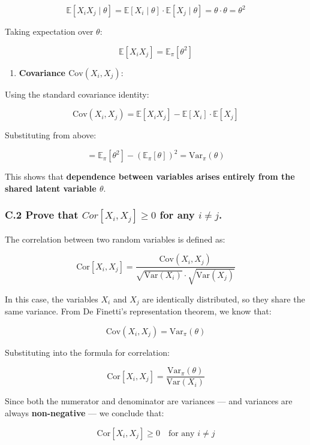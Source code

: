 \documentclass[
]{article}
\providecommand{\tightlist}{%
  \setlength{\itemsep}{0pt}\setlength{\parskip}{0pt}}
\begin{document}
\[
\mathbb{E}[X_i X_j \mid \theta] = \mathbb{E}[X_i \mid \theta] \cdot \mathbb{E}[X_j \mid \theta] = \theta \cdot \theta = \theta^2
\]

Taking expectation over \(\theta\):

\[
\mathbb{E}[X_i X_j] = \mathbb{E}_\pi[\theta^2]
\]

\begin{enumerate}
\def\labelenumi{\arabic{enumi}.}
\setcounter{enumi}{2}
\tightlist
\item
  \textbf{Covariance \(\text{Cov}(X_i, X_j)\)}:
\end{enumerate}

Using the standard covariance identity:

\[
\text{Cov}(X_i, X_j) = \mathbb{E}[X_i X_j] - \mathbb{E}[X_i] \cdot \mathbb{E}[X_j]
\]

Substituting from above:

\[
= \mathbb{E}_\pi[\theta^2] - \left( \mathbb{E}_\pi[\theta] \right)^2 = \text{Var}_\pi(\theta)
\]

This shows that \textbf{dependence between variables arises entirely
from the shared latent variable \(\theta\)}.

\subsubsection{\texorpdfstring{C.2 Prove that \(Cor[X_i,X_j] \geq 0\)
for any
\(i \neq j\).}{C.2 Prove that Cor{[}X\_i,X\_j{]} \textbackslash geq 0 for any i \textbackslash neq j.}}\label{c.2-prove-that-corx_ix_j-geq-0-for-any-i-neq-j.}

The correlation between two random variables is defined as:

\[
\text{Cor}[X_i, X_j] = \frac{\text{Cov}(X_i, X_j)}{\sqrt{\text{Var}(X_i)} \cdot \sqrt{\text{Var}(X_j)}}
\]

In this case, the variables \(X_i\) and \(X_j\) are identically
distributed, so they share the same variance. From De Finetti's
representation theorem, we know that:

\[
\text{Cov}(X_i, X_j) = \text{Var}_\pi(\theta)
\]

Substituting into the formula for correlation:

\[
\text{Cor}[X_i, X_j] = \frac{\text{Var}_\pi(\theta)}{\text{Var}(X_i)}
\]

Since both the numerator and denominator are variances --- and variances
are always \textbf{non-negative} --- we conclude that:

\[
\text{Cor}[X_i, X_j] \geq 0 \quad \text{for any } i \neq j
\]
\end{document}
